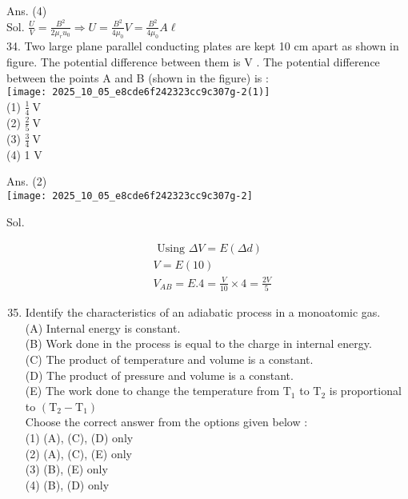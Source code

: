 \documentclass[10pt]{article}
\begin{document}
Ans. (4)\\
Sol. \(\frac{U}{V}=\frac{B^{2}}{2 \mu_{r} u_{0}} \Rightarrow U=\frac{B^{2}}{4 \mu_{0}} V=\frac{B^{2}}{4 \mu_{0}} A \ell\)\\
34. Two large plane parallel conducting plates are kept 10 cm apart as shown in figure. The potential difference between them is V . The potential difference between the points A and B (shown in the figure) is :\\
\texttt{[image: 2025\_10\_05\_e8cde6f242323cc9c307g-2(1)]}\\
(1) \(\frac{1}{4} \mathrm{~V}\)\\
(2) \(\frac{2}{5} \mathrm{~V}\)\\
(3) \(\frac{3}{4} \mathrm{~V}\)\\
(4) 1 V

Ans. (2)\\
\texttt{[image: 2025\_10\_05\_e8cde6f242323cc9c307g-2]}

Sol.

\[
\begin{aligned}
& \text { Using } \Delta V=E(\Delta d) \\
& V=E(10) \\
& V_{A B}=E .4=\frac{V}{10} \times 4=\frac{2 V}{5}
\end{aligned}
\]

\begin{enumerate}
  \setcounter{enumi}{34}
  \item Identify the characteristics of an adiabatic process in a monoatomic gas.\\
(A) Internal energy is constant.\\
(B) Work done in the process is equal to the charge in internal energy.\\
(C) The product of temperature and volume is a constant.\\
(D) The product of pressure and volume is a constant.\\
(E) The work done to change the temperature from \(\mathrm{T}_{1}\) to \(\mathrm{T}_{2}\) is proportional to \(\left(\mathrm{T}_{2}-\mathrm{T}_{1}\right)\)\\
Choose the correct answer from the options given below :\\
(1) (A), (C), (D) only\\
(2) (A), (C), (E) only\\
(3) (B), (E) only\\
(4) (B), (D) only
\end{enumerate}
\end{document}
